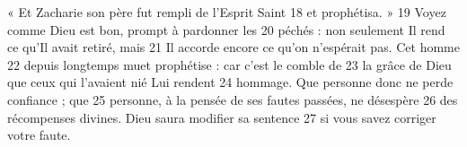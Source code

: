 « Et Zacharie son père fut rempli de l'Esprit Saint	 
18	 	et prophétisa. »	 
19	 	Voyez comme Dieu est bon, prompt à pardonner les	 
20	 	péchés : non seulement Il rend ce qu'Il avait retiré, mais	 
21	 	Il accorde encore ce qu'on n'espérait pas. Cet homme	 
22	 	depuis longtemps muet prophétise : car c'est le comble de	 
23	 	la grâce de Dieu que ceux qui l'avaient nié Lui rendent	 
24	 	hommage. Que personne donc ne perde confiance ; que	 
25	 	personne, à la pensée de ses fautes passées, ne désespère	 
26	 	des récompenses divines. Dieu saura modifier sa sentence	 
27	 	si vous savez corriger votre faute.